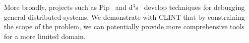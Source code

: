More broadly, projects such as Pip~\cite{pip} and d$^3$s~\cite{d3s} develop
techniques for debugging general distributed systems.  We demonstrate with CLINT that by constraining the scope of the problem,
we can potentially provide more comprehensive tools for a more limited domain.





